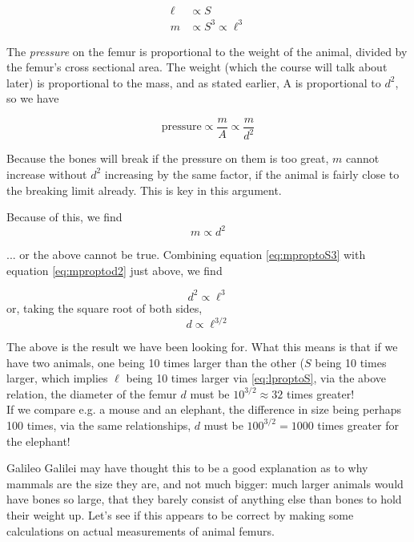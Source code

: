 \documentclass[12pt,a4paper]{report}
\begin{document}
\begin{align}
 \ell &\propto S \label{eq:lproptoS}\\
 m &\propto S^3 \propto \ell^3 \label{eq:mproptoS3}
\end{align}

The \emph{pressure} on the femur is proportional to the weight of the animal, divided by the femur's cross sectional area. The weight (which the course will talk about later) is proportional to the mass, and as stated earlier, A is proportional to $d^2$, so we have

\begin{equation}
 \text{pressure} \propto \frac{m}{A} \propto \frac{m}{d^2}
\end{equation}

Because the bones will break if the pressure on them is too great, $m$ cannot increase without $d^2$ increasing by the same factor, if the animal is fairly close to the breaking limit already. This is key in this argument.

Because of this, we find
\begin{equation}
m \propto d^2 \label{eq:mproptod2}
\end{equation}

... or the above cannot be true.
Combining equation \eqref{eq:mproptoS3} with equation \eqref{eq:mproptod2} just above, we find

\begin{equation}
 d^2 \propto \ell^3
\end{equation}
or, taking the square root of both sides,
\begin{equation}
 d \propto \ell^{3/2} \label{eq:dproptoell32}
\end{equation}

The above is the result we have been looking for. What this means is that if we have two animals, one being 10 times larger than the other ($S$ being 10 times larger, which implies $\ell$ being 10 times larger via \eqref{eq:lproptoS}, via the above relation, the diameter of the femur $d$ must be $10^{3/2} \approx 32$ times greater!\\
If we compare e.g. a mouse and an elephant, the difference in size being perhaps 100 times, via the same relationships, $d$ must be $100^{3/2} = 1000$ times greater for the elephant!

Galileo Galilei may have thought this to be a good explanation as to why mammals are the size they are, and not much bigger: much larger animals would have bones so large, that they barely consist of anything else than bones to hold their weight up. Let's see if this appears to be correct by making some calculations on actual measurements of animal femurs.
\end{document}
